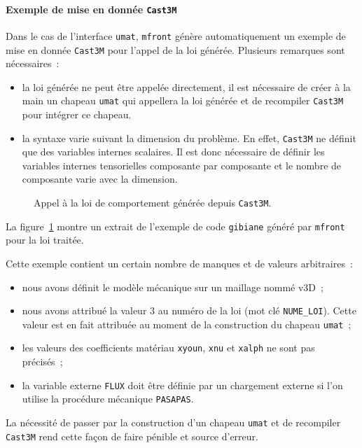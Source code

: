 \documentclass[rectoverso,pleiades,pstricks,leqno,anti]{texmf/note_technique_2010}
\newcommand{\mfront}{\texttt{mfront}}
\newcommand{\castem}{\texttt{Cast3M}}
\newcommand{\code}[1]{
  \psframebox[linecolor=ceaorange,shadow=true,blur=true]{
    \begin{minipage}[htbp]{1.0\linewidth}
      \ttfamily\scriptsize #1
    \end{minipage}
  }
}
\begin{document}
\paragraph{Exemple de mise en donnée \castem{}} Dans le cas
de l'interface \texttt{umat}, \mfront{} génère automatiquement
un exemple de mise en donnée \castem{} pour l'appel de la loi
générée. Plusieurs remarques sont nécessaires~:
\begin{itemize}
\item la loi générée ne peut être appelée directement, il est
nécessaire de créer à la main un chapeau \texttt{umat} qui
appellera la loi générée et de recompiler \castem{} pour
intégrer ce chapeau.
\item la syntaxe varie suivant la dimension du problème. En
effet, \castem{} ne définit que des variables internes
scalaires. Il est donc nécessaire de définir les variables
internes tensorielles composante par composante et le
nombre de composante varie avec la dimension.
\end{itemize}

\begin{figure}[htbp]
  \centering
  \code{{\ttfamily }}  
  \caption{Appel à la loi de comportement générée depuis \castem{}.}
  \label{fig:mfrontcastem}
\end{figure}

La figure~\ref{fig:mfrontcastem} montre un extrait de
l'exemple de code \texttt{gibiane} généré par \mfront{}
pour la loi traitée.

Cette exemple contient un certain nombre de manques et
de valeurs arbitraires~:
\begin{itemize}
\item nous avons définit le modèle mécanique sur un
  maillage nommé v3D~;
\item nous avons attribué la valeur \(3\) au numéro de
  la loi (mot clé \texttt{NUME\_LOI}). Cette valeur
  est en fait attribuée au moment de la construction
  du chapeau \texttt{umat}~;
\item les valeurs des coefficients matériau \texttt{xyoun},
  \texttt{xnu} et \texttt{xalph} ne sont pas précisés~;
\item la variable externe \texttt{FLUX} doit être définie
  par un chargement externe si l'on utilise la
  procédure mécanique \texttt{PASAPAS}.
\end{itemize}

La nécessité de passer par la construction d'un chapeau
 \texttt{umat} et de recompiler \castem{} rend cette
 façon de faire pénible et source d'erreur.
\end{document}
